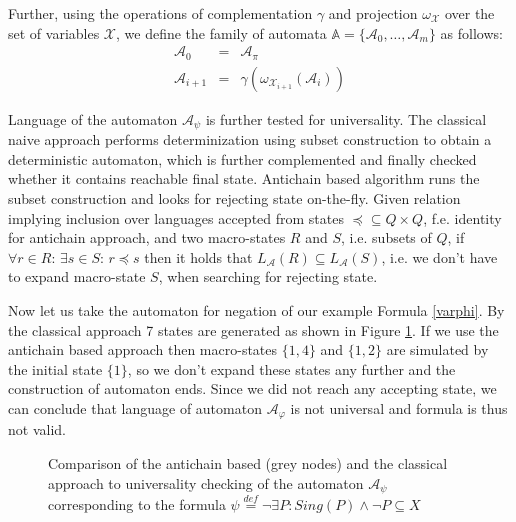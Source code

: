 \documentclass{eeict}
\begin{document}
Further, using the operations of complementation $\gamma$ and projection
$\omega_{\mathcal{X}}$ over the set of variables $\mathcal{X}$, we define the
family of automata $\mathds{A} = \{\mathcal{A}_0,\ldots,\mathcal{A}_m\}$ as follows:
\begin{eqnarray}
 \mathcal{A}_0 & = & \mathcal{A}_\pi\\
 \mathcal{A}_{i+1} & = & \gamma(\omega_{\mathcal{X}_{i+1}} (\mathcal{A}_i))
\end{eqnarray}

Language of the automaton $\mathcal{A}_\psi$ is further tested for universality.
The classical naive approach performs determinization using subset construction
to obtain a deterministic automaton, which is further complemented and finally
checked whether it contains reachable final state. Antichain based
algorithm \cite{anti} runs the subset construction and looks for rejecting
state on-the-fly. Given relation implying inclusion over languages accepted from
states $\preceq \subseteq Q \times Q$, f.e. identity for antichain approach,
and two macro-states $R$ and $S$, i.e. subsets of $Q$, if $\forall r \in
R:\,\exists s \in S:\,r \preceq s$ then it
holds that $L_\mathcal{A}(R) \subseteq L_\mathcal{A}(S)$, i.e. we don't have to
expand macro-state $S$, when searching for rejecting state.

Now let us take the automaton for negation of our example Formula \ref{varphi}.
By the classical approach 7 states are generated as shown in Figure \ref{compare}. If we use the antichain based approach then
macro-states $\{1, 4\}$ and $\{1, 2\}$ are simulated by the initial state
$\{1\}$, so we don't expand these states any further and the construction of automaton
ends.
Since we did not reach any accepting state, we can conclude that language of
automaton $\mathcal{A}_\varphi$ is not universal and formula is thus not valid.

\begin{figure}
 \begin{center}
 \end{center}
 \caption{Comparison of the antichain based (grey nodes) and the classical
 approach to universality checking of the automaton $\mathcal{A}_\psi$
 corresponding to the formula $\psi \overset{\mathit{def}}{=} \neg\exists P:
 Sing(P) \wedge\neg P \subseteq X$}\label{compare}
\end{figure}
\end{document}
